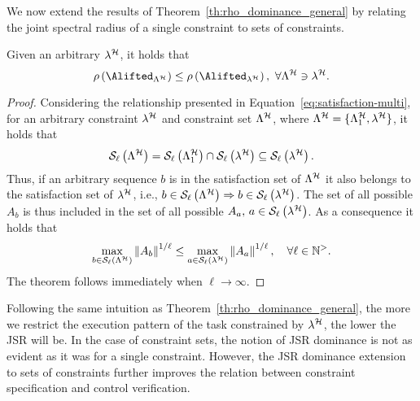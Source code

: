 We now extend the results of Theorem~\ref{th:rho_dominance_general} by relating the joint spectral radius of a single constraint to sets of constraints.
\begin{theorem}%
    \label{th:rho_dominance_set_general}%
    Given an arbitrary \ewhc{} $\lambda^{\mathcal{H}}$, it holds that
    $$
        \rho\left(\Alifted_{\Lambda^\strat}\right) \leq \rho \left( \Alifted_{\lambda^\strat} \right) ,\,\, \forall \Lambda^\strat \ni \lambda^\strat.
    $$

    \begin{proof}
        Considering the relationship presented in Equation~\eqref{eq:satisfaction-multi}, for an arbitrary constraint $\lambda^{\mathcal{H}}$ and constraint set $\Lambda^{\mathcal{H}}$, where $\Lambda^{\mathcal{H}} = \{ \Lambda^{\mathcal{H}}_1, \lambda^{\mathcal{H}} \}$, it holds that
        \begin{equation}
            \mathcal{S}_{\ell}\left( \Lambda^{\mathcal{H}}  \right) = \mathcal{S}_{\ell}\left(  \Lambda^{\mathcal{H}}_1  \right) \cap \mathcal{S}_{\ell}\left(  \lambda^{\mathcal{H}}  \right) \subseteq \mathcal{S}_{\ell}\left(  \lambda^{\mathcal{H}}  \right).
        \end{equation}
        Thus, if an arbitrary sequence $b$ is in the satisfaction set of $\Lambda^{\mathcal{H}}$ it also belongs to the satisfaction set of $\lambda^{\mathcal{H}}$, i.e., $b \in \mathcal{S}_{\ell}\left(  \Lambda^{\mathcal{H}}  \right) \Rightarrow b \in \mathcal{S}_{\ell}\left(  \lambda^{\mathcal{H}}  \right)$.
        The set of all possible $A_{b}$ is thus included in the set of all possible $A_{a},\, a \in \mathcal{S}_{\ell}\left(  \lambda^{\mathcal{H}}  \right)$.
        As a consequence it holds that
        \begin{equation*}
            \max_{b \in \mathcal{S}_{\ell}\left(  \Lambda^{\mathcal{H}}  \right) } \left\lVert A_{b}\right\rVert^{1/\ell} \leq
            \max_{a \in \mathcal{S}_{\ell}\left(  \lambda^{\mathcal{H}}  \right) } \left\lVert A_{a}\right\rVert^{1/\ell}, \quad
            \forall \ell\in\mathbb{N}^{>}.
        \end{equation*}
        The theorem follows immediately when $\ell\rightarrow \infty$.
    \end{proof}
\end{theorem}

Following the same intuition as Theorem~\ref{th:rho_dominance_general}, the more we restrict the execution pattern of the task constrained by $\lambda^{\mathcal{H}}$, the lower the JSR will be.
In the case of constraint sets, the notion of JSR dominance is not as evident as it was for a single constraint.
However, the JSR dominance extension to sets of constraints further improves the relation between constraint specification and control verification.

